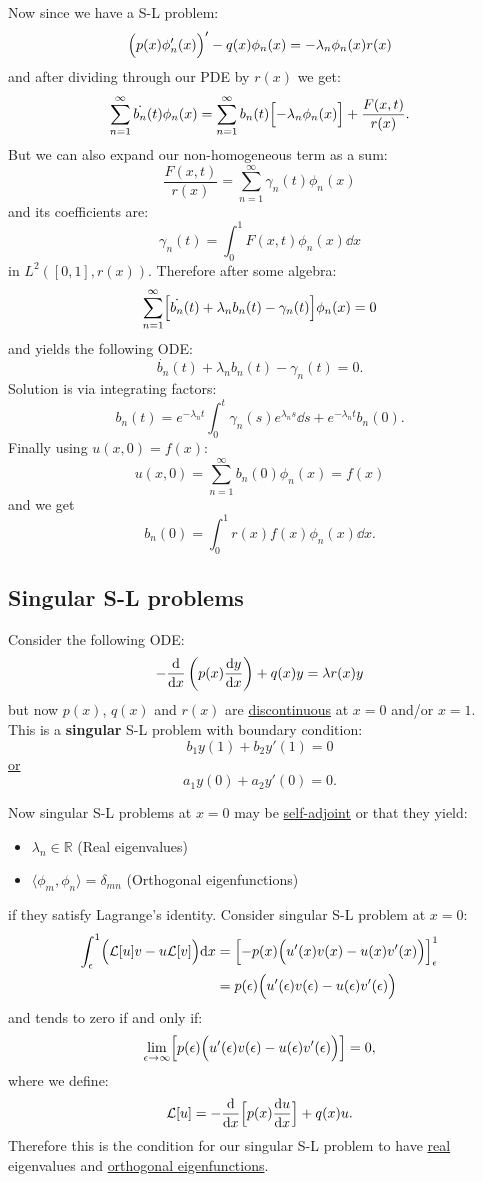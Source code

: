 \documentclass{article}
\begin{document}
\begin{multicols}{3}
Now since we have a S-L problem:
$$\Bigl(p(x)\phi'_n(x)\Bigr)'-q(x)\phi_n(x)
=-\lambda_n\phi_n(x)r(x)$$
and after dividing through our PDE by $r(x)$ we get:
$$\sum_{n=1}^{\infty}\dot{b_n}(t)\phi_n(x)
=\sum_{n=1}^{\infty}b_n(t)\Bigl[-\lambda_n\phi_n(x)\Bigr]
+\frac{F(x,t)}{r(x)}.$$
But we can also expand our non-homogeneous term as a sum:
$$\frac{F(x,t)}{r(x)}=\sum_{n=1}^{\infty}\gamma_n(t)\phi_n(x)$$
and its coefficients are:
$$\gamma_n(t)=\int_{0}^{1}F(x,t)\phi_n(x)\dd x$$
in $L^2([0,1],r(x))$. Therefore after some algebra:
$$\sum_{n=1}^{\infty}\Bigl[\dot{b_n}(t)
+\lambda_n b_n(t)-\gamma_n(t)\Bigr]\phi_n(x)=0$$
and yields the following ODE:
$$\dot{b_n}(t)
+\lambda_n b_n(t)-\gamma_n(t)=0.$$
Solution is via integrating factors:
$$b_n(t)=e^{-\lambda_n t}
\int_{0}^{t}\gamma_n(s)e^{\lambda_n s}\dd s
+e^{-\lambda_n t}b_n(0).$$
Finally using $u(x,0)=f(x)$:
$$u(x,0)=\sum_{n=1}^{\infty}b_n(0)\phi_n(x)
=f(x)$$
and we get
$$b_n(0)=\int_{0}^{1}r(x)f(x)\phi_n(x)\dd x.$$

\subsection{Singular S-L problems}
Consider the following ODE:
$$-\dv{x}\left(p(x)\dv{y}{x}\right)+q(x)y=\lambda r(x)y$$
but now $p(x)$, $q(x)$ and $r(x)$ are \underline{discontinuous}
at $x=0$ and/or $x=1$. \\
This is a \textbf{singular} S-L problem with boundary condition:
$$b_1 y(1)+b_2 y'(1)=0$$
\underline{or}
$$a_1 y(0)+a_2 y'(0)=0.$$

Now singular S-L problems at $x=0$ may be \underline{self-adjoint} or that they yield:
\begin{itemize}
    \item $\lambda_n\in\mathbb{R}$ (Real eigenvalues)
    \item $\langle \phi_m,\phi_n \rangle=\delta_{mn}$
    (Orthogonal eigenfunctions)
\end{itemize}
if they satisfy Lagrange's identity. Consider singular S-L problem at $x=0$:
\begin{align*}
    \int_{\epsilon}^{1}\Bigl(\mathcal{L}[u]v
    -u\mathcal{L}[v]\Bigr)\dd x
    &=\Bigl[-p(x)
    \Bigl(u'(x)v(x)-u(x)v'(x)\Bigr)\Bigr]_{\epsilon}^{1} \\
    &=p(\epsilon)
    \Bigl(u'(\epsilon)v(\epsilon)-u(\epsilon)v'(\epsilon)\Bigr)
\end{align*}
and tends to zero if and only if:
$$\lim_{\epsilon\rightarrow\infty}
\Bigl[p(\epsilon)
\Bigl(u'(\epsilon)v(\epsilon)-u(\epsilon)v'(\epsilon)\Bigr)\Bigr]=0,$$
where we define:
$$\mathcal{L}[u]=-\dv{x}\Bigl[p(x)\dv{u}{x}\Bigr]+q(x)u.$$
Therefore this is the condition for our singular S-L
problem to have \underline{real} eigenvalues and 
\underline{orthogonal eigenfunctions}.


\end{multicols}
\end{document}
